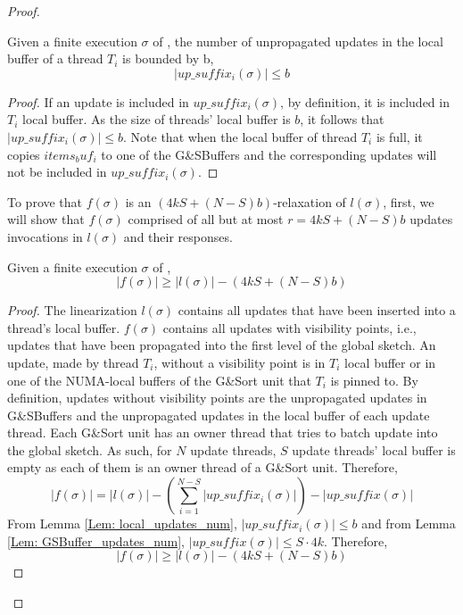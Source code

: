 \begin{proof}
\begin{lemma}\label{Lem: local_updates_num}
Given a finite execution $\sigma$ of \mysketch, the number of unpropagated updates in the local buffer of a thread \(T_i\) is bounded by b, \[|\mathit{up\_suffix_i}(\sigma)| \leq b\]
\end{lemma}
\begin{proof}
If an update is included in \(\mathit{up\_suffix_i}(\sigma)\), by definition, it is included in $T_i$ local buffer. 
As the size of threads' local buffer is $b$, it follows that $|\mathit{up\_suffix_i}(\sigma)| \leq b$. 
Note that when the local buffer of thread \(T_i\) is full, it copies \(items_buf_i\) to one of the G\&SBuffers and the corresponding updates will not be included in \(up\_suffix_i(\sigma)\).
\end{proof}

To prove that $f(\sigma)$ is an \((4kS + (N-S)b)\)-relaxation of $l(\sigma)$, first, we will show that $f(\sigma)$ comprised of all but at most \(r=4kS + (N-S)b\) updates invocations in $l(\sigma)$ and their responses.

\begin{lemma} \label{Lem: invocations_bound}
Given a finite execution $\sigma$ of \mysketch, \[ |f(\sigma)| \ge |l(\sigma)| - (4kS + (N-S)b) \]
\end{lemma}
\begin{proof}
The linearization $l(\sigma)$ contains all updates that have been inserted into a thread's local buffer. $f(\sigma)$ contains all updates with visibility points, i.e., updates that have been propagated into the first level of the global sketch. 
An update, made by thread $T_i$, without a visibility point is in $T_i$ local buffer or in one of the NUMA-local buffers of the G\&Sort unit that $T_i$ is pinned to. By definition, updates without visibility points are the unpropagated updates in G\&SBuffers and the unpropagated updates in the local buffer of each update thread. Each G\&Sort unit has an owner thread that tries to batch update into the global sketch. As such, for \(N\) update threads, $S$ update threads' local buffer is empty as each of them is an owner thread of a G\&Sort unit. Therefore,
\begin{equation}
    |f(\sigma)| = |l(\sigma)| - \left(\sum_{i=1}^{N-S}|\mathit{up\_suffix_i}(\sigma)|\right) - |\mathit{up\_suffix}(\sigma)|
\end{equation}
From Lemma \ref{Lem: local_updates_num}, \(|\mathit{up\_suffix_i}(\sigma)| \leq b\) and from Lemma \ref{Lem: GSBuffer_updates_num}, \(|\mathit{up\_suffix}(\sigma)| \leq S \cdot 4k\). Therefore,
\begin{equation}
    |f(\sigma)| \ge |l(\sigma)| - (4kS + (N-S)b)
\end{equation}


\end{proof}
\end{proof}
